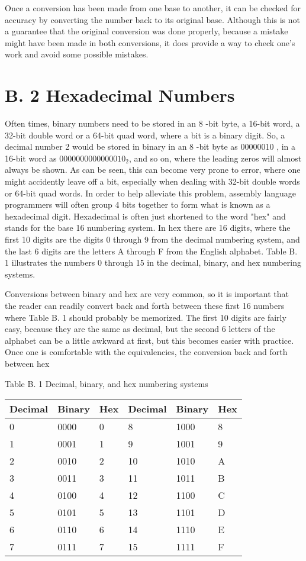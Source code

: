 \documentclass[10pt]{article}
\begin{document}
Once a conversion has been made from one base to another, it can be checked for accuracy by converting the number back to its original base. Although this is not a guarantee that the original conversion was done properly, because a mistake might have been made in both conversions, it does provide a way to check one's work and avoid some possible mistakes.

\section*{B. 2 Hexadecimal Numbers}
Often times, binary numbers need to be stored in an 8 -bit byte, a 16-bit word, a 32-bit double word or a 64-bit quad word, where a bit is a binary digit. So, a decimal number 2 would be stored in binary in an 8 -bit byte as 00000010 , in a 16-bit word as $0000000000000010_{2}$, and so on, where the leading zeros will almost always be shown. As can be seen, this can become very prone to error, where one might accidently leave off a bit, especially when dealing with 32-bit double words or 64-bit quad words. In order to help alleviate this problem, assembly language programmers will often group 4 bits together to form what is known as a hexadecimal digit. Hexadecimal is often just shortened to the word "hex" and stands for the base 16 numbering system. In hex there are 16 digits, where the first 10 digits are the digits 0 through 9 from the decimal numbering system, and the last 6 digits are the letters A through F from the English alphabet. Table B. 1 illustrates the numbers 0 through 15 in the decimal, binary, and hex numbering systems.

Conversions between binary and hex are very common, so it is important that the reader can readily convert back and forth between these first 16 numbers where Table B. 1 should probably be memorized. The first 10 digits are fairly easy, because they are the same as decimal, but the second 6 letters of the alphabet can be a little awkward at first, but this becomes easier with practice. Once one is comfortable with the equivalencies, the conversion back and forth between hex

Table B. 1 Decimal, binary, and hex numbering systems

\begin{center}
\begin{tabular}{|l|l|l|l|l|l|}
\hline
Decimal & Binary & Hex & Decimal & Binary & Hex \\
\hline
0 & 0000 & 0 & 8 & 1000 & 8 \\
\hline
1 & 0001 & 1 & 9 & 1001 & 9 \\
\hline
2 & 0010 & 2 & 10 & 1010 & A \\
\hline
3 & 0011 & 3 & 11 & 1011 & B \\
\hline
4 & 0100 & 4 & 12 & 1100 & C \\
\hline
5 & 0101 & 5 & 13 & 1101 & D \\
\hline
6 & 0110 & 6 & 14 & 1110 & E \\
\hline
7 & 0111 & 7 & 15 & 1111 & F \\
\hline
\end{tabular}
\end{center}
\end{document}
